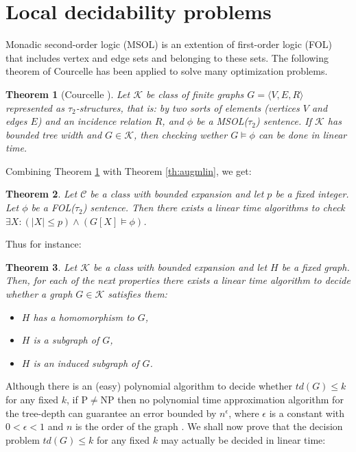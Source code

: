 \documentclass[a4paper]{amsart}
\newtheorem{theorem}{Theorem}[section]
\theoremstyle{definition}
\theoremstyle{remark}
\newcommand{\card}[1]{\lvert{#1}\rvert}
\begin{document}
\section{Local decidability problems}


Monadic second-order logic (MSOL) is an extention of first-order logic (FOL)
that includes vertex and edge sets and belonging to these
sets. The following theorem of Courcelle has been applied to solve
many optimization problems. 

\begin{theorem}[Courcelle \cite{Courcelle1}\cite{Courcelle2}]
\label{th:msol}
Let $\mathcal K$ be class of finite graphs $G=\langle V,E,R\rangle$
represented as $\tau_2$-structures, that is: by two sorts of
elements (vertices $V$ and edges $E$) and an incidence relation $R$,
and $\phi$ be a MSOL($\tau_2$) sentence. If $\mathcal K$ has bounded
tree width and $G\in\mathcal K$, then checking wether $G\vDash\phi$
can be done in linear time.
\end{theorem}

Combining Theorem \ref{th:msol} with Theorem \ref{th:augmlin}, we get:

\begin{theorem}
Let $\mathcal C$ be a class with bounded expansion and let $p$ be a
fixed integer. Let $\phi$ be a FOL($\tau_2$) sentence. Then there exists a
linear time algorithms to check  $\exists X: (\card{X}\leq p)\wedge(G[X]\vDash\phi)$.
\end{theorem}

Thus for instance:

\begin{theorem}
Let $\mathcal K$ be a class with bounded expansion and let $H$ be a
fixed graph. Then, for each of the next properties there exists a linear
time algorithm to decide whether a graph $G\in\mathcal K$ satisfies them:
\begin{itemize}
\item $H$ has a homomorphism to $G$,
\item $H$ is a subgraph of $G$,
\item $H$ is an induced subgraph of $G$.
\end{itemize}
\end{theorem}

Although there is an (easy) polynomial algorithm to decide whether
$td(G) \leq k$ for any fixed $k$, if P$\neq$NP then no
polynomial time approximation algorithm for the tree-depth can
guarantee an error bounded by $n^\epsilon$, where $\epsilon$ is a
constant with $0<\epsilon<1$ and $n$ is the order of the graph
\cite{treewidth_approx}.
We shall now prove that the decision problem $td(G) \leq k$ for any
fixed $k$ may actually be decided in linear time:
\end{document}

